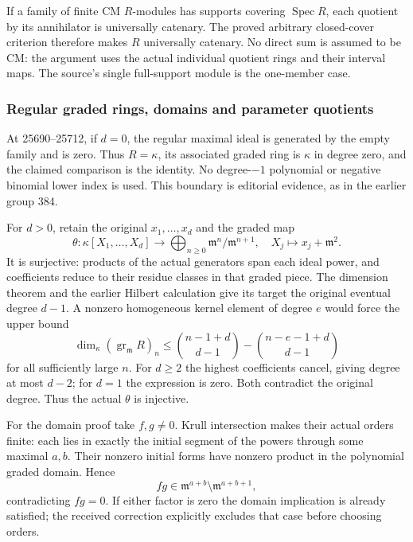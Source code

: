 If a family of finite CM \(R\)-modules has supports covering \(\operatorname{Spec}R\), each quotient by its annihilator is universally catenary. The proved arbitrary closed-cover criterion therefore makes \(R\) universally catenary. No direct sum is assumed to be CM: the argument uses the actual individual quotient rings and their interval maps. The source's single full-support module is the one-member case.

\subsubsection{Regular graded rings, domains and parameter quotients}\label{algebra-proof-020-regular-graded-rings-domains-and-parameter-quotients}

At 25690--25712, if \(d=0\), the regular maximal ideal is generated by the empty family and is zero. Thus \(R=\kappa\), its associated graded ring is \(\kappa\) in degree zero, and the claimed comparison is the identity. No degree-\(-1\) polynomial or negative binomial lower index is used. This boundary is editorial evidence, as in the earlier group 384.

For \(d>0\), retain the original \(x_1,\ldots,x_d\) and the graded map \[
 \theta:\kappa[X_1,\ldots,X_d]\longrightarrow
 \bigoplus_{n\ge0}\mathfrak m^n/\mathfrak m^{n+1},\quad
 X_j\longmapsto x_j+\mathfrak m^2.
\] It is surjective: products of the actual generators span each ideal power, and coefficients reduce to their residue classes in that graded piece. The dimension theorem and the earlier Hilbert calculation give its target the original eventual degree \(d-1\). A nonzero homogeneous kernel element of degree \(e\) would force the upper bound \[
 \dim_\kappa(\operatorname{gr}_{\mathfrak m}R)_n
 \le {n-1+d\choose d-1}-{n-e-1+d\choose d-1}
\] for all sufficiently large \(n\). For \(d\ge2\) the highest coefficients cancel, giving degree at most \(d-2\); for \(d=1\) the expression is zero. Both contradict the original degree. Thus the actual \(\theta\) is injective.

For the domain proof take \(f,g\ne0\). Krull intersection makes their actual orders finite: each lies in exactly the initial segment of the powers through some maximal \(a,b\). Their nonzero initial forms have nonzero product in the polynomial graded domain. Hence \[
 fg\in\mathfrak m^{a+b}\setminus\mathfrak m^{a+b+1},
\] contradicting \(fg=0\). If either factor is zero the domain implication is already satisfied; the received correction explicitly excludes that case before choosing orders.

